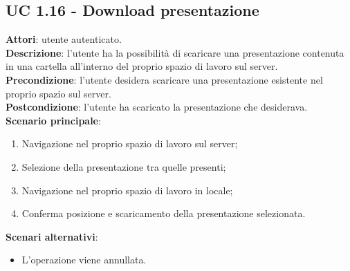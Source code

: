 \subsection{UC 1.16 - Download presentazione}{
	\label{uc1.16}
	\textbf{Attori}: utente autenticato.	\\
	\textbf{Descrizione}: l'utente ha la possibilità di scaricare una presentazione contenuta in una cartella all'interno del proprio spazio di lavoro sul server. \\
	\textbf{Precondizione}: l'utente desidera scaricare una presentazione esistente nel proprio spazio sul server.	\\
	\textbf{Postcondizione}: l'utente ha scaricato la presentazione che desiderava.	\\
	\textbf{Scenario principale}:
	\begin{enumerate}
		\item Navigazione nel proprio spazio di lavoro sul server;
		\item Selezione della presentazione tra quelle presenti;
		\item Navigazione nel proprio spazio di lavoro in locale;
		\item Conferma posizione e scaricamento della presentazione selezionata.
	\end{enumerate}
	\textbf{Scenari alternativi}: 
	\begin{itemize}
		\item L'operazione viene annullata.
	\end{itemize}
	}